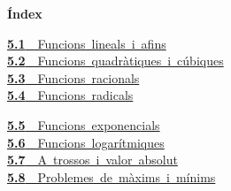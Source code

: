 \documentclass[11pt,a4paper]{article}
\begin{document}
\begin{tcolorbox}[colback=fmsurface,colframe=fmsurface,arc=3mm,left=4mm,right=4mm,top=2mm,bottom=2mm]
\small\textbf{Índex}\par\smallskip
\begin{minipage}[t]{0.49\linewidth}\small \mbox{\hyperlink{sec1}{\textbf{\color{fmgreen}5.1}\ \ Funcions lineals i afins}}\\[3pt]
\mbox{\hyperlink{sec2}{\textbf{\color{fmgreen}5.2}\ \ Funcions quadràtiques i cúbiques}}\\[3pt]
\mbox{\hyperlink{sec3}{\textbf{\color{fmgreen}5.3}\ \ Funcions racionals}}\\[3pt]
\mbox{\hyperlink{sec4}{\textbf{\color{fmgreen}5.4}\ \ Funcions radicals}}\\[3pt]\end{minipage}\hfill\begin{minipage}[t]{0.49\linewidth}\small \mbox{\hyperlink{sec5}{\textbf{\color{fmgreen}5.5}\ \ Funcions exponencials}}\\[3pt]
\mbox{\hyperlink{sec6}{\textbf{\color{fmgreen}5.6}\ \ Funcions logarítmiques}}\\[3pt]
\mbox{\hyperlink{sec7}{\textbf{\color{fmgreen}5.7}\ \ A trossos i valor absolut}}\\[3pt]
\mbox{\hyperlink{sec8}{\textbf{\color{fmgreen}5.8}\ \ Problemes de màxims i mínims}}\\[3pt]\end{minipage}
\end{tcolorbox}

\Needspace{5.7cm}
\end{document}
